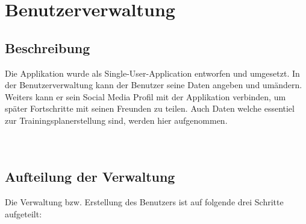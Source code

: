 \documentclass[FIPLY_base.tex]{subfiles}
\begin{document}
\section{Benutzerverwaltung}
\subsection{Beschreibung}
Die Applikation wurde als Single-User-Application entworfen und umgesetzt. In der Benutzerverwaltung kann der Benutzer seine
Daten angeben und umändern. Weiters kann er sein Social Media Profil mit der Applikation verbinden, um später Fortschritte mit seinen Freunden zu teilen.
Auch Daten welche essentiel zur Trainingsplanerstellung sind, werden hier aufgenommen.
\\\
\\\

\subsection{Aufteilung der Verwaltung}
Die Verwaltung bzw. Erstellung des Benutzers ist auf folgende drei Schritte aufgeteilt:
\end{document}
